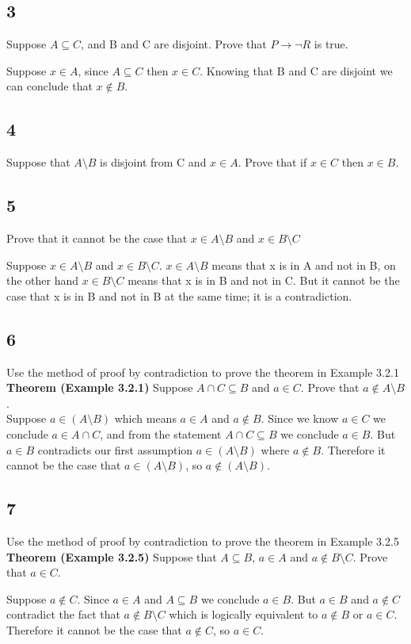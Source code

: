 \documentclass{article}
\begin{document}
\subsection{3}
Suppose $A \subseteq C$, and B and C are disjoint. Prove that $P \rightarrow \neg R$ is true.

Suppose $x \in A$, since $A \subseteq C$ then $x \in C$. Knowing that B and C are disjoint we can conclude that $x \notin B$.
\subsection{4}
Suppose that $A \setminus B$ is disjoint from C and $x \in A$. Prove that if $x \in C$ then $x\in B$.
\subsection{5}
Prove that it cannot be the case that $x\in A \setminus B$ and $x \in B  \setminus C$

Suppose $x \in A \setminus B$ and $x \in B \setminus C$. $x \in A \setminus B$ means that x is in A and not in B, on the other hand $x \in B \setminus C$ means that x is in B and not in C. But it cannot be the case that x is in B and not in B at the same time; it is a contradiction.

\subsection{6}
Use the method of proof by contradiction to prove the theorem in Example 3.2.1
\\
\textbf{Theorem (Example 3.2.1)} Suppose $A \cap C \subseteq B$ and $a \in C$. Prove that $a \notin A \setminus B$.
\\
Suppose $a \in (A \setminus B)$ which means $a \in A$ and $a \notin B$. Since we know $a \in C$ we conclude $a \in A \cap C$, and from the statement $A \cap C \subseteq B$ we conclude $a \in B$. But $a \in B$ contradicts our first assumption $a\in (A \setminus B)$ where $a \notin B$. Therefore it cannot be the case that  $a \in (A \setminus B)$, so $a \notin (A \setminus B)$.
\subsection{7}
Use the method of proof by contradiction to prove the theorem  in Example 3.2.5
\textbf{Theorem (Example 3.2.5)} Suppose that $A \subseteq B$, $a \in A$ and $a \notin B \setminus C$. Prove that $a \in C$.

Suppose $a \notin C$. Since $a\in A$ and $A \subseteq B$ we conclude $a \in B$. But $a \in B$ and $a \notin C$ contradict the fact that $a \notin B \setminus C$ which is logically equivalent to $a \notin B$ or $a \in C$. Therefore it cannot be the case that  $a \notin C$, so $a \in C$. 
\end{document}
